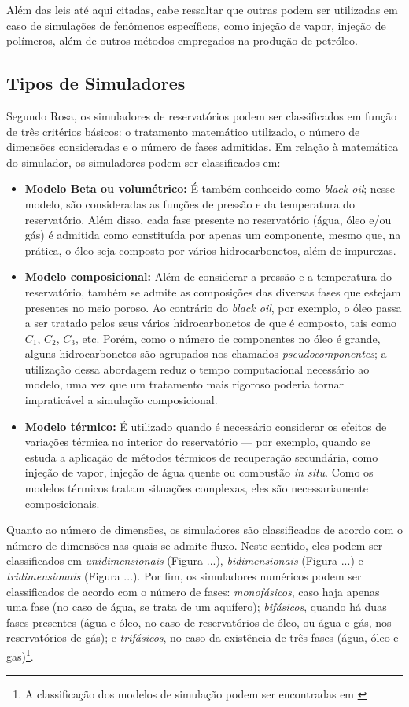 Além das leis até aqui citadas, cabe ressaltar que outras podem ser utilizadas em caso de simulações de fenômenos específicos, como injeção de vapor, injeção de polímeros, além de outros métodos empregados na produção de petróleo.

\subsection{Tipos de Simuladores}
Segundo Rosa, os simuladores de reservatórios podem ser classificados em função de três critérios básicos: o tratamento matemático utilizado, o número de dimensões consideradas e o número de fases admitidas. Em relação à matemática do simulador, os simuladores podem ser classificados em: 

\begin{itemize}
	\item \textbf{Modelo Beta ou volumétrico:} É também conhecido como \textit{black oil}; nesse modelo, são consideradas as funções de pressão e da temperatura do reservatório. Além disso, cada fase presente no reservatório (água, óleo e/ou gás) é admitida como constituída por apenas um componente, mesmo que, na prática, o óleo seja composto por vários hidrocarbonetos, além de impurezas.
	\item \textbf{Modelo composicional:} Além de considerar a pressão e a temperatura do reservatório, também se admite as composições das diversas fases que estejam presentes no meio poroso. Ao contrário do \textit{black oil}, por exemplo, o óleo passa a ser tratado pelos seus vários hidrocarbonetos de que é composto, tais como $C_1$, $C_2$, $C_3$, etc. Porém, como o número de componentes no óleo é grande, alguns hidrocarbonetos são agrupados nos chamados \textit{pseudocomponentes}; a utilização dessa abordagem reduz o tempo computacional necessário ao modelo, uma vez que um tratamento mais rigoroso poderia tornar impraticável a simulação composicional.
	\item \textbf{Modelo térmico:} É utilizado quando é necessário considerar os efeitos de variações térmica no interior do reservatório --- por exemplo, quando se estuda a aplicação de métodos térmicos de recuperação secundária, como injeção de vapor, injeção de água quente ou combustão \textit{in situ}. Como os modelos térmicos tratam situações complexas, eles são necessariamente composicionais.
\end{itemize}

Quanto ao número de dimensões, os simuladores são classificados de acordo com o número de dimensões nas quais se admite fluxo. Neste sentido, eles podem ser classificados em \textit{unidimensionais} (Figura ...), \textit{bidimensionais} (Figura ...) e \textit{tridimensionais} (Figura ...). Por fim, os simuladores numéricos podem ser classificados de acordo com o número de fases: \textit{monofásicos}, caso haja apenas uma fase (no caso de água, se trata de um aquífero); \textit{bifásicos}, quando há duas fases presentes (água e óleo, no caso de reservatórios de óleo, ou água e gás, nos reservatórios de gás); e \textit{trifásicos}, no caso da existência de três fases (água, óleo e gas)\footnote{A classificação dos modelos de simulação podem ser encontradas em \cite[pp. 517--519]{engres}}.

